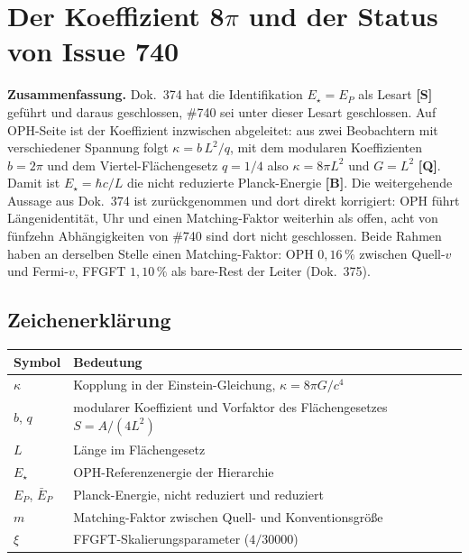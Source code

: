 \providecommand{\BM}{\textbf{[B]}}
\providecommand{\KM}{\textbf{[K]}}
\providecommand{\SM}{\textbf{[S]}}
\providecommand{\XM}{\textbf{[X]}}
\providecommand{\QM}{\textbf{[Q]}}

\chapter*{Der Koeffizient 8$\pi$ und der Status von Issue 740}

{\small\noindent\textbf{Zusammenfassung.}\quad\ignorespaces
Dok.~374 hat die Identifikation $E_\star=E_P$ als Lesart \SM{} geführt und
daraus geschlossen, \#740 sei unter dieser Lesart geschlossen. Auf OPH-Seite
ist der Koeffizient inzwischen abgeleitet: aus zwei Beobachtern mit
verschiedener Spannung folgt $\kappa=b\,L^2/q$, mit dem modularen Koeffizienten
$b=2\pi$ und dem Viertel-Flächengesetz $q=1/4$ also $\kappa=8\pi L^2$ und
$G=L^2$ \QM. Damit ist $E_\star=\hbar c/L$ die nicht reduzierte Planck-Energie
\BM. Die weitergehende Aussage aus Dok.~374 ist zurückgenommen und dort direkt
korrigiert: OPH führt
Längenidentität, Uhr und einen Matching-Faktor weiterhin als offen, acht von
fünfzehn Abhängigkeiten von \#740 sind dort nicht geschlossen. Beide Rahmen
haben an derselben Stelle einen Matching-Faktor: OPH $0{,}16\,\%$ zwischen
Quell-$v$ und Fermi-$v$, FFGFT $1{,}10\,\%$ als bare-Rest der Leiter
(Dok.~375).
}\medskip

\section*{Zeichenerklärung}

\medskip


\medskip
\begin{tabular}{@{}lp{10cm}@{}}
\toprule
\textbf{Symbol} & \textbf{Bedeutung} \\
\midrule
$\kappa$ & Kopplung in der Einstein-Gleichung, $\kappa=8\pi G/c^4$ \\
$b$, $q$ & modularer Koeffizient und Vorfaktor des Flächengesetzes $S=A/(4L^2)$ \\
$L$ & Länge im Flächengesetz \\
$E_\star$ & OPH-Referenzenergie der Hierarchie \\
$E_P$, $\bar E_P$ & Planck-Energie, nicht reduziert und reduziert \\
$m$ & Matching-Faktor zwischen Quell- und Konventionsgröße \\
$\xi$ & FFGFT-Skalierungsparameter ($4/30000$) \\
\bottomrule
\end{tabular}

